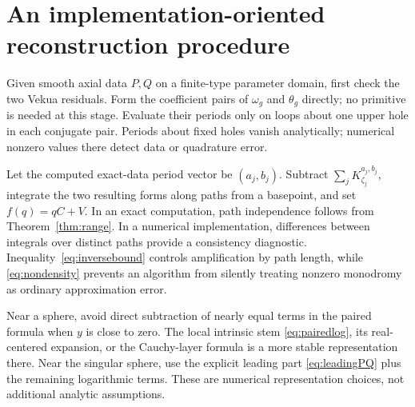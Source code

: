 \documentclass[11pt,a4paper]{article}
\numberwithin{equation}{section}
\theoremstyle{definition}
\theoremstyle{remark}
\begin{document}
\appendix
\section{An implementation-oriented reconstruction procedure}
Given smooth axial data $P,Q$ on a finite-type parameter domain, first
check the two Vekua residuals. Form the coefficient pairs of
$\omega_g$ and $\theta_g$ directly; no primitive is needed at this
stage. Evaluate their periods only on loops about one upper hole in
each conjugate pair. Periods about fixed holes vanish analytically;
numerical nonzero values there detect data or quadrature error.

Let the computed exact-data period vector be $(a_j,b_j)$. Subtract
$\sum_jK_{\zeta_j}^{a_j,b_j}$, integrate the two resulting forms along
paths from a basepoint, and set $f(q)=qC+V$. In an exact computation,
path independence follows from Theorem~\ref{thm:range}. In a numerical
implementation, differences between integrals over distinct paths
provide a consistency diagnostic. Inequality~\eqref{eq:inversebound}
controls amplification by path length, while
\eqref{eq:nondensity} prevents an algorithm from silently treating
nonzero monodromy as ordinary approximation error.

Near a sphere, avoid direct subtraction of nearly equal terms in the
paired formula when $y$ is close to zero. The local intrinsic stem
\eqref{eq:pairedlog}, its real-centered expansion, or the Cauchy-layer
formula is a more stable representation there. Near the singular
sphere, use the explicit leading part \eqref{eq:leadingPQ} plus the
remaining logarithmic terms. These are numerical representation choices,
not additional analytic assumptions.
\end{document}

